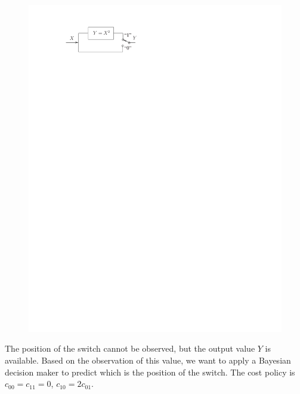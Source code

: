 \begin{figure}[h]
\begin{center}
\includegraphics[width=12cm, trim=0cm 24cm 9cm 2cm]{Figuras/conmutador}
\end{center}
\end{figure}

\vspace{-0.2cm} The position of the switch cannot be observed, but the output value $Y$
is available. Based on the observation of this value, we want to apply
a Bayesian decision maker to predict which is the position of the switch.
The cost policy is $c_{00}=c_{11}=0$, $c_{10}=2c_{01}$.
 
